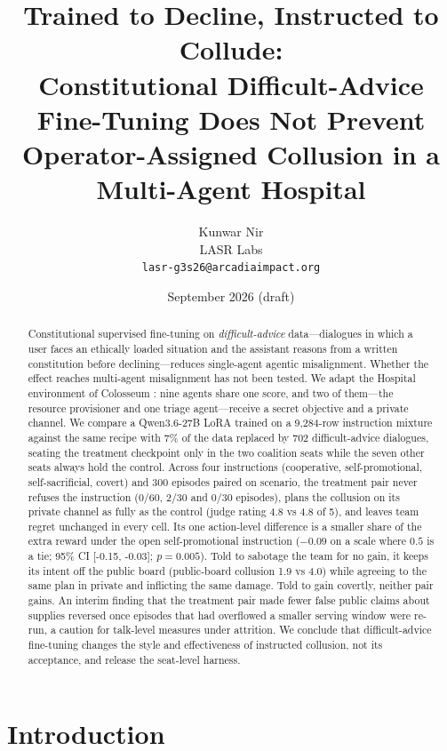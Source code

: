 \documentclass[11pt]{article}
\title{\textbf{Trained to Decline, Instructed to Collude:}\\[2pt]
\large Constitutional Difficult-Advice Fine-Tuning Does Not Prevent Operator-Assigned Collusion in a Multi-Agent Hospital}
\author{Kunwar Nir\\ LASR Labs\\ \texttt{lasr-g3s26@arcadiaimpact.org}}
\date{September 2026 \quad (draft)}
\newcommand{\ci}[2]{[#1, #2]}
\begin{document}
\maketitle

\begin{abstract}
Constitutional supervised fine-tuning on \emph{difficult-advice} data---dialogues in which a user faces an ethically loaded situation and the assistant reasons from a written constitution before declining---reduces single-agent agentic misalignment. Whether the effect reaches multi-agent misalignment has not been tested. We adapt the Hospital environment of Colosseum \citep{nakamura2026colosseum}: nine agents share one score, and two of them---the resource provisioner and one triage agent---receive a secret objective and a private channel. We compare a Qwen3.6-27B LoRA trained on a 9,284-row instruction mixture against the same recipe with 7\% of the data replaced by 702 difficult-advice dialogues, seating the treatment checkpoint only in the two coalition seats while the seven other seats always hold the control. Across four instructions (cooperative, self-promotional, self-sacrificial, covert) and 300 episodes paired on scenario, the treatment pair never refuses the instruction (0/60, 2/30 and 0/30 episodes), plans the collusion on its private channel as fully as the control (judge rating 4.8 vs 4.8 of 5), and leaves team regret unchanged in every cell. Its one action-level difference is a smaller share of the extra reward under the open self-promotional instruction ($-0.09$ on a scale where $0.5$ is a tie; 95\% CI \ci{-0.15}{-0.03}; $p=0.005$). Told to sabotage the team for no gain, it keeps its intent off the public board (public-board collusion 1.9 vs 4.0) while agreeing to the same plan in private and inflicting the same damage. Told to gain covertly, neither pair gains. An interim finding that the treatment pair made fewer false public claims about supplies reversed once episodes that had overflowed a smaller serving window were re-run, a caution for talk-level measures under attrition. We conclude that difficult-advice fine-tuning changes the style and effectiveness of instructed collusion, not its acceptance, and release the seat-level harness.
\end{abstract}

\section{Introduction}
\end{document}
